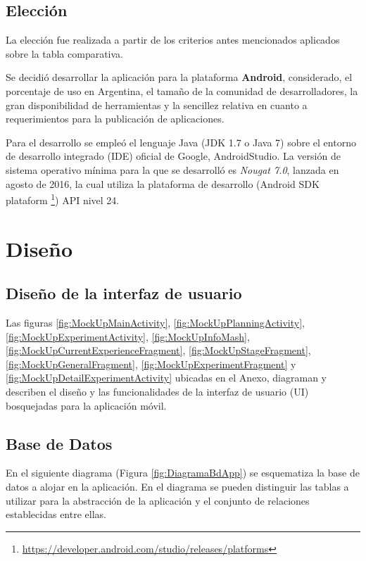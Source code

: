     
    \subsection{Elección}
    \par
    La elección fue realizada a partir de los criterios antes mencionados aplicados sobre la tabla comparativa.
    \par
    Se decidió desarrollar la aplicación para la plataforma \textbf{Android}, considerado, el porcentaje de uso en Argentina, el tamaño de la comunidad de desarrolladores, la gran disponibilidad de herramientas y la sencillez relativa en cuanto a requerimientos para la publicación de aplicaciones.
    
    \par Para el desarrollo se empleó el lenguaje Java (JDK 1.7 o Java 7) sobre el entorno de desarrollo integrado (IDE) oficial de Google, AndroidStudio. La versión de sistema operativo mínima para la que se desarrolló es \textit{Nougat 7.0}, lanzada en agosto de 2016, la cual utiliza la plataforma de desarrollo (Android SDK plataform \footnote{\url{https://developer.android.com/studio/releases/platforms}}) API nivel 24.

    
    
\section{Diseño}
    \subsection{Diseño de la interfaz de usuario}
        \par Las figuras \ref{fig:MockUpMainActivity}, \ref{fig:MockUpPlanningActivity}, \ref{fig:MockUpExperimentActivity}, \ref{fig:MockUpInfoMash}, \ref{fig:MockUpCurrentExperienceFragment}, \ref{fig:MockUpStageFragment}, \ref{fig:MockUpGeneralFragment}, \ref{fig:MockUpExperimentFragment} y \ref{fig:MockUpDetailExperimentActivity} ubicadas en el Anexo, diagraman y describen el diseño y las funcionalidades de la interfaz de usuario (UI) bosquejadas para la aplicación móvil.

    \subsection{Base de Datos}
        \par En el siguiente diagrama (Figura \ref{fig:DiagramaBdApp}) se esquematiza la base de datos a alojar en la aplicación. En el diagrama se pueden distinguir las tablas a utilizar para la abstracción de la aplicación y el conjunto de relaciones establecidas entre ellas.
        
